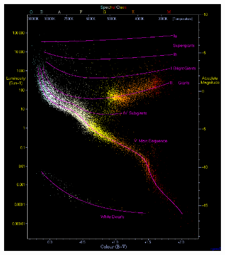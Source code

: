 \begin{figure}[H]
	\begin{minipage}{0.4 \textwidth}
		\hspace{1cm}
		\includegraphics[scale=0.22]{figures/Introduction/HRD2}	
	\end{minipage}
	\begin{minipage}{0.4 \textwidth}
		\hspace{1.5cm}

\end{minipage}
\end{figure}
